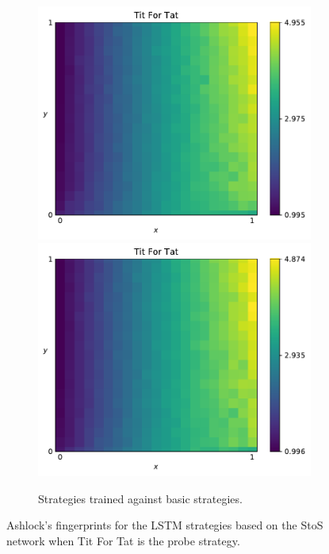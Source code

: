 \begin{figure}[!htbp]
\begin{subfigure}{\textwidth}
        \includegraphics[width=.3\textwidth]{src/chapters/07/img/tit_for_tat_basic_sequence_1.pdf}
        \includegraphics[width=.3\textwidth]{src/chapters/07/img/tit_for_tat_basic_sequence_0_78.pdf}
        \caption{Strategies trained against basic strategies.}
    \end{subfigure}
    \caption{Ashlock's fingerprints for the LSTM strategies based on the StoS
    network when Tit For Tat is the probe strategy.}\label{fig:ashlock_fingerprints_tft_s_to_s}
\end{figure}

